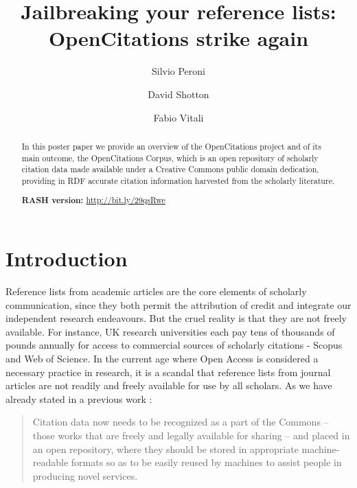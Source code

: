 \documentclass[runningheads,a4paper]{llncs}
\begin{document}
\mainmatter

\title{Jailbreaking your reference lists:\\ OpenCitations strike again}
\author{Silvio Peroni \and
David Shotton \and
Fabio Vitali}
\maketitle

\begin{abstract}
In this poster paper we provide an overview of the OpenCitations project and of its main outcome, the OpenCitations Corpus, which is an open repository of scholarly citation data made available under a Creative Commons public domain dedication, providing in RDF accurate citation information harvested from the scholarly literature.

{\bf RASH version:} \url{http://bit.ly/29qsRwe}

\end{abstract}


\section{Introduction}

Reference lists from academic articles are the core elements of scholarly communication, since they both permit the attribution of credit and integrate our independent research endeavours. But the cruel reality is that they are not freely available. For instance, UK research universities each pay tens of thousands of pounds annually for access to commercial sources of scholarly citations - Scopus and Web of Science. In the current age where Open Access is considered a necessary practice in research, it is a scandal that reference lists from journal articles are not readily and freely available for use by all scholars. As we have already stated in a previous work  \cite{__RefNumPara__293_1852566440}: 

\begin{quote}
Citation data now needs to be recognized as a part of the Commons -- those works that are freely and legally available for sharing -- and placed in an open repository, where they should be stored in appropriate machine-readable formats so as to be easily reused by machines to assist people in producing novel services.
\end{quote}
\end{document}

